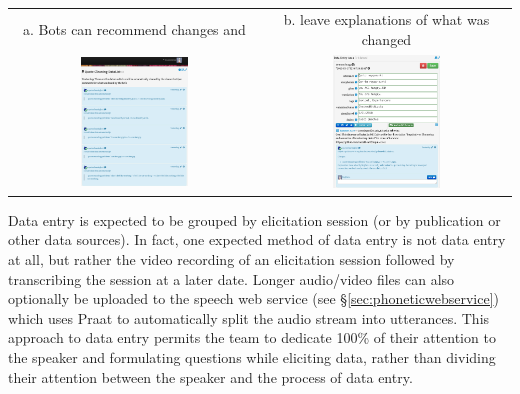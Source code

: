 \documentclass[letterpaper, 12pt, dvips]{mitwpl}
\begin{document}
\begin{exe} 
\ex \label{ex:bots}  ~  \\ 
 \begin{tabular}{c c} 
 a.  Bots can recommend changes and & b.  leave explanations of what was changed \\
   \includegraphics[width=0.45\textwidth]{cleaningBotsDatalist} &
   \includegraphics[width=0.45\textwidth]{cleaningBotCameBy}
\end{tabular}
\end{exe}



Data entry is expected to be grouped by elicitation session (or by publication or other data sources).
In fact,
one expected method of data entry is not data entry at all,
but rather the video recording of an elicitation session followed by transcribing the session at a later date.
Longer audio/video files can also optionally be uploaded to the speech web service (see \S \ref{sec:phoneticwebservice}) which uses Praat to automatically split the audio stream into utterances.
 This approach to data entry permits the team to dedicate 100\% of their attention to the speaker and formulating questions while eliciting data,
rather than dividing their attention between the speaker and the process of data entry.
\end{document}
